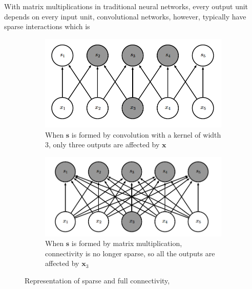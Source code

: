 \documentclass[12pt]{report}
\numberwithin{equation}{section}
\begin{document}
\noindent 
With matrix multiplications in traditional neural networks, every output unit depends on every input unit, convolutional networks, however, typically have sparse interactions which is 
\begin{figure}[H]
\centering
	\begin{subfigure}[t]{\textwidth}
	\centering
	\includegraphics[scale=0.5]{png/sparse2.png}
 	\caption{When $\bm{s}$ is formed by convolution with a kernel of width $3$, only three outputs are affected by $\bm{x}$}	 
	\label{subfig:sparse1}
	\end{subfigure}
	
	\medskip
	
	\begin{subfigure}[t]{\textwidth}
	\centering
	\includegraphics[scale=0.5]{png/sparse1.png}		
	\caption{When $\bm{s}$ is formed by matrix multiplication, connectivity is no longer sparse, so all the outputs are affected by $\bm{x}_3$}	 
	\label{subfig:sparse2}
	\end{subfigure}
\caption[Representation of sparse and full connectivity]{Representation of sparse and full connectivity, \protect\textbf{\cite{10.5555/3086952}}}	 
\label{fig:sparse}
\end{figure}
\noindent
\end{document}
